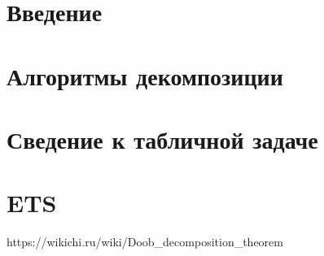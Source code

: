 \documentclass[a4paper,12pt]{book}
\begin{document}
	\newpage
	\tableofcontents
	
	\newpage
	\chapter{Введение}
	
	
	
	\newpage
	\chapter{Алгоритмы декомпозиции}
	
	

	\newpage
	\chapter{Сведение к табличной задаче}
	

	\newpage
	\chapter{ETS}
	

\newpage
\begin{thebibliography}{1}
	https://wikichi.ru/wiki/Doob\_decomposition\_theorem
\end{thebibliography}


	
\end{document}
